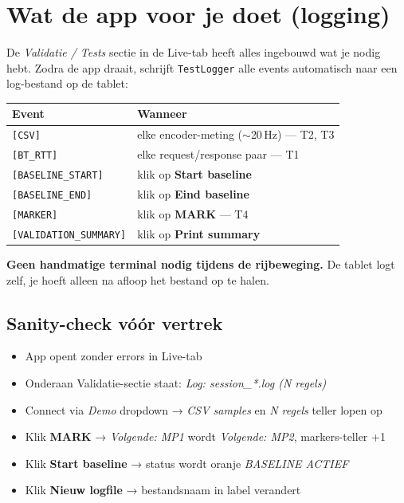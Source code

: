 \documentclass[11pt, a4paper]{article}
\begin{document}
\section{Wat de app voor je doet (logging)}

De \emph{Validatie / Tests} sectie in de Live-tab heeft alles ingebouwd
wat je nodig hebt. Zodra de app draait, schrijft \texttt{TestLogger}
alle events automatisch naar een log-bestand op de tablet:

\begin{tabular}{@{}lp{8.2cm}@{}}
\toprule
\textbf{Event} & \textbf{Wanneer} \\
\midrule
\texttt{[CSV]}             & elke encoder-meting ($\sim$20\,Hz) --- T2, T3 \\
\texttt{[BT\_RTT]}         & elke request/response paar --- T1 \\
\texttt{[BASELINE\_START]} & klik op \textbf{Start baseline} \\
\texttt{[BASELINE\_END]}   & klik op \textbf{Eind baseline} \\
\texttt{[MARKER]}          & klik op \textbf{MARK} --- T4 \\
\texttt{[VALIDATION\_SUMMARY]} & klik op \textbf{Print summary} \\
\bottomrule
\end{tabular}

\textbf{Geen handmatige terminal nodig tijdens de rijbeweging.} De
tablet logt zelf, je hoeft alleen na afloop het bestand op te halen.

\subsection{Sanity-check vóór vertrek}

\begin{itemize}[leftmargin=2em, label=$\square$]
  \item App opent zonder errors in Live-tab
  \item Onderaan Validatie-sectie staat: \emph{Log: session\_*.log (N regels)}
  \item Connect via \emph{Demo} dropdown → \emph{CSV samples} en \emph{N regels} teller lopen op
  \item Klik \textbf{MARK} → \emph{Volgende: MP1} wordt \emph{Volgende: MP2}, markers-teller +1
  \item Klik \textbf{Start baseline} → status wordt oranje \emph{BASELINE ACTIEF}
  \item Klik \textbf{Nieuw logfile} → bestandsnaam in label verandert
\end{itemize}
\end{document}
